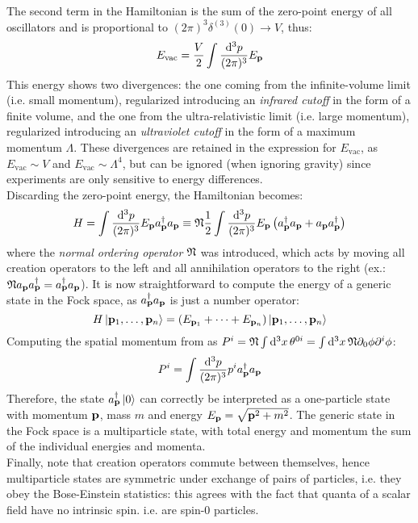 The second term in the Hamiltonian  is the sum of the zero-point energy of all oscillators and is proportional to $ (2\pi)^3 \delta^{(3)}(0) \rightarrow V $, thus:
\begin{equation*}
  E_\text{vac} = \frac{V}{2} \int \frac{\mathrm{d}^3p}{(2\pi)^3} E_{\mathbf{p}}
\end{equation*}
This energy shows two divergences: the one coming from the infinite-volume limit (i.e. small momentum), regularized introducing an \textit{infrared cutoff} in the form of a finite volume, and the one from the ultra-relativistic limit (i.e. large momentum), regularized introducing an \textit{ultraviolet cutoff} in the form of a maximum momentum $ \Lambda $. These divergences are retained in the expression for $ E_\text{vac} $, as $ E_\text{vac} \sim V $ and $ E_\text{vac} \sim \Lambda^4 $, but can be ignored (when ignoring gravity) since experiments are only sensitive to energy differences.\\
Discarding the zero-point energy, the Hamiltonian becomes:
\begin{equation}
  H = \int \frac{\mathrm{d}^3p}{(2\pi)^3} E_{\mathbf{p}} a_{\mathbf{p}}^\dagger a_{\mathbf{p}} \equiv \mathfrak{N} \frac{1}{2} \int \frac{\mathrm{d}^3p}{(2\pi)^3} E_{\mathbf{p}} \left( a_{\mathbf{p}}^\dagger a_{\mathbf{p}} + a_{\mathbf{p}} a_{\mathbf{p}}^\dagger \right)
\end{equation}
where the \textit{normal ordering operator} $ \mathfrak{N} $ was introduced, which acts by moving all creation operators to the left and all annihilation operators to the right (ex.: $ \mathfrak{N} a_{\mathbf{p}} a_{\mathbf{p}}^\dagger = a_{\mathbf{p}}^\dagger a_{\mathbf{p}} $). It is now straightforward to compute the energy of a generic state in the Fock space, as $ a_{\mathbf{p}}^\dagger a_{\mathbf{p}} $ is just a number operator:
\begin{equation}
  H \ket{\mathbf{p}_1 , \dots , \mathbf{p}_n} = \left( E_{\mathbf{p}_1} + \dots + E_{\mathbf{p}_n} \right) \ket{\mathbf{p}_1 , \dots , \mathbf{p}_n}
\end{equation}
Computing the spatial momentum from  as $ P^i = \mathfrak{N} \int \mathrm{d}^3x\, \theta^{0i} = \int \mathrm{d}^3x\, \mathfrak{N} \partial_0 \phi \partial^i \phi $:
\begin{equation}
  P^i = \int \frac{\mathrm{d}^3p}{(2\pi)^3} p^i a_{\mathbf{p}}^\dagger a_{\mathbf{p}}
\end{equation}
Therefore, the state $ a_{\mathbf{p}}^\dagger \ket{0} $ can correctly be interpreted as a one-particle state with momentum $ \mathbf{p} $, mass $ m $ and energy $ E_{\mathbf{p}} = \sqrt{\mathbf{p}^2 + m^2} $. The generic state in the Fock space is a multiparticle state, with total energy and momentum the sum of the individual energies and momenta.\\
Finally, note that creation operators commute between themselves, hence multiparticle states are symmetric under exchange of pairs of particles, i.e. they obey the Bose-Einstein statistics: this agrees with the fact that quanta of a scalar field have no intrinsic spin. i.e. are spin-0 particles.


